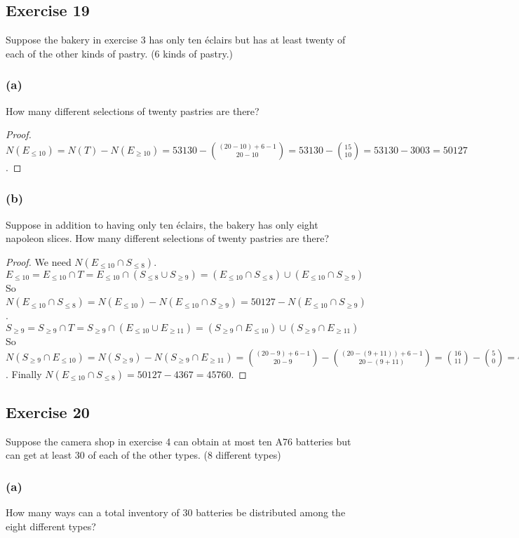 \documentclass[14pt]{extarticle}
\begin{document}
\subsection{Exercise 19}
Suppose the bakery in exercise 3 has only ten éclairs but has at least twenty of each of the other kinds of pastry. (6 kinds
of pastry.)

\subsubsection{(a)}
How many different selections of twenty pastries are there?

\begin{proof}
\(N(E_{\leq 10}) = N(T) - N(E_{\geq 10}) = 53130 - \binom{(20-10)+6-1}{20-10} = 53130 - \binom{15}{10} = 53130 -
3003 = 50127\).
\end{proof}

\subsubsection{(b)}
Suppose in addition to having only ten éclairs, the bakery has only eight napoleon slices. How many different selections of twenty pastries are there?

\begin{proof}
We need \(N(E_{\leq 10} \cap S_{\leq 8})\).
\[
E_{\leq 10} = E_{\leq 10} \cap T = E_{\leq 10} \cap (S_{\leq 8} \cup S_{\geq 9}) = (E_{\leq 10} \cap S_{\leq 8}) \cup (E_{\leq 10} \cap S_{\geq 9})
\]
So \(N(E_{\leq 10} \cap S_{\leq 8}) = N(E_{\leq 10}) - N(E_{\leq 10} \cap S_{\geq 9}) = 50127 - N(E_{\leq 10} \cap 
S_{\geq 9})\).
\[
S_{\geq 9} = S_{\geq 9} \cap T = S_{\geq 9} \cap (E_{\leq 10} \cup E_{\geq 11}) = (S_{\geq 9} \cap E_{\leq 10}) \cup 
(S_{\geq 9} \cap E_{\geq 11})
\]
So \(N(S_{\geq 9} \cap E_{\leq 10}) = N(S_{\geq 9}) - N(S_{\geq 9} \cap E_{\geq 11}) = \binom{(20-9)+6-1}{20-9} - 
\binom{(20-(9+11))+6-1}{20-(9+11)} = \binom{16}{11} - \binom{5}{0} = 4368-1 = 4367\). Finally \(N(E_{\leq 10} \cap 
S_{\leq 8}) = 50127 - 4367 = 45760\).
\end{proof}

\subsection{Exercise 20}
Suppose the camera shop in exercise 4 can obtain at most ten A76 batteries but can get at least 30 of each of the other 
types. (8 different types)

\subsubsection{(a)}
How many ways can a total inventory of 30 batteries be distributed among the eight different types?
\end{document}
